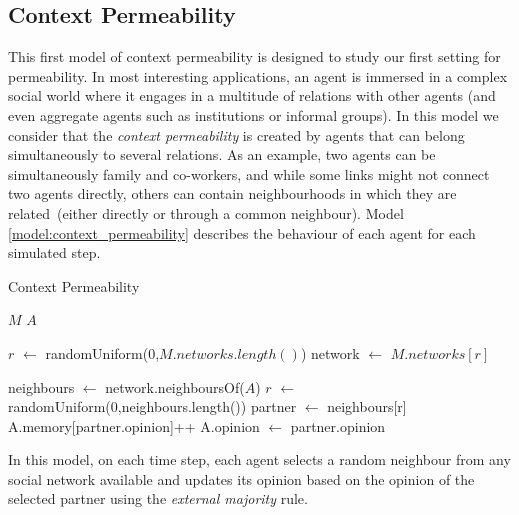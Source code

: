 \documentclass[preprint,number]{elsarticle}
\begin{document}
	\subsection{Context Permeability}
	This first model of context permeability \cite{Antunes2007,Antunes2010} is designed to study our first setting for permeability. In most interesting applications, an agent is immersed in a complex social world where it engages in a multitude of relations with other agents (and even aggregate agents such as institutions or informal groups). In this model we consider that the \textit{context permeability} is created by agents that can belong simultaneously to several relations. As an example, two agents can be simultaneously family and co-workers, and while some links might not connect two agents directly, others can contain neighbourhoods in which they are related~(either directly or through a common neighbour). Model \ref{model:context_permeability} describes the behaviour of each agent for each simulated step.
	\begin{algorithm}[H]
		\caption{Context Permeability}
		\label{model:context_permeability}
		\begin{algorithmic}
			\vspace{0.5em}
			\STATE $M$ 
			\STATE $A$ 
			\\ \hrulefill 
			
			\STATE{}
			\STATE $r$ $\leftarrow$ randomUniform(0,$ M.networks.length() $)
			\STATE network $\leftarrow$ $M.networks[r]$
			
			\STATE
			\STATE {}
			\STATE neighbours $\leftarrow$ network.neighboursOf($A$) 
			\STATE $r$ $\leftarrow$ randomUniform(0,neighbours.length())
			\STATE partner $\leftarrow$ neighbours[r]
			\STATE
			\STATE {}
			\STATE {}
			\STATE A.memory[partner.opinion]++
			\STATE A.opinion $\leftarrow$ partner.opinion
			\ENDIF
		\end{algorithmic}
	\end{algorithm}
	In this model, on each time step, each agent selects a random neighbour from any 
	social network available and updates its opinion based on the opinion of the selected partner using the \textit{external majority} rule. 
	
\end{document}
